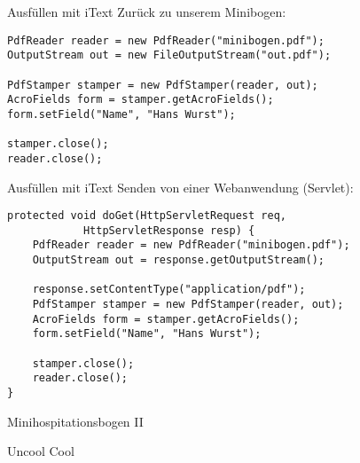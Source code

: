\documentclass{beamer}
\begin{document}
\begin{frame}[fragile]{Ausfüllen mit iText}
Zurück zu unserem Minibogen:

\bigskip

\begin{verbatim}
PdfReader reader = new PdfReader("minibogen.pdf");
OutputStream out = new FileOutputStream("out.pdf");

PdfStamper stamper = new PdfStamper(reader, out);
AcroFields form = stamper.getAcroFields();
form.setField("Name", "Hans Wurst");

stamper.close();
reader.close();
\end{verbatim}
\end{frame}

\begin{frame}[fragile]{Ausfüllen mit iText}
Senden von einer Webanwendung (Servlet):

\bigskip

\begin{verbatim}
protected void doGet(HttpServletRequest req,
            HttpServletResponse resp) {
    PdfReader reader = new PdfReader("minibogen.pdf");
    OutputStream out = response.getOutputStream();

    response.setContentType("application/pdf");
    PdfStamper stamper = new PdfStamper(reader, out);
    AcroFields form = stamper.getAcroFields();
    form.setField("Name", "Hans Wurst");

    stamper.close();
    reader.close();
}
\end{verbatim}
\end{frame}


\begin{frame}{Minihospitationsbogen II}
	\begin{framed}
		\begin{Form}

		    \hrulefill

    		\begin{center}
			    \Huge Uncool\hspace{0.5em}
		    	\large
			    \Huge \hspace{0.5em} Cool
		    \end{center}
    		\smallskip
		\end{Form}
	\end{framed}
\end{frame}
\end{document}
